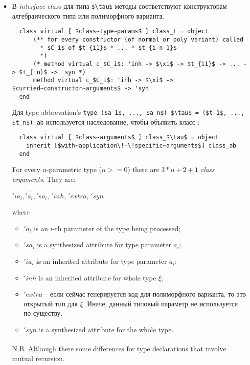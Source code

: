\documentclass[acmsmall,review,anonymous]{acmart}\settopmatter{printfolios=true,printccs=false,printacmref=false}
\begin{document}
\begin{itemize}
  \item В \textit{interface class} для типа \lstinline{$\tau$} методы соответствуют конструкторам алгебраического типа или полиморфного варианта. 
  \begin{lstlisting}
  class virtual [ $class~type~params$ ] class_t = object
      (** for every constructor (of normal or poly variant) called
        * $C_i$ of $t_{i1}$ * ... * $t_{i n_1}$
        *)
      (* method virtual c_$C_i$: 'inh -> $\xi$ -> $t_{i1}$ -> ... -> $t_{in}$ -> 'syn *)
      method virtual c_$C_i$: 'inh -> $\xi$ -> $curried~constructor~arguments$ -> 'syn
  end
  \end{lstlisting}
  Для type abbrevation's \lstinline{type ($a_1$, ..., $a_n$) $\tau$ = ($t_1$, ..., $t_n$) ab} 
  используется наследование, чтобы объявить класс : 
  \begin{lstlisting}
  class virtual [ $class~arguments$ ] class_$\tau$ = object
    inherit [$with~application\!-\!specific~arguments$] class_ab
  end
  \end{lstlisting}

  For every $n$-parametric type ($n>=0$) there are $3*n+2+1$ \emph{class arguments}. They are:
    \begin{center}
        $\overline{'ia_i, 'a_i, 'sa_i}$, $'inh$, $'extra$, $'syn$
    \end{center}
  where \begin{itemize}
          \item $'a_i$ is an $i$-th parameter of the type being processed;
          \item $'sa_i$ is a synthesized attribute for type parameter $a_i$;
          \item $'ia_i$ is an inherited attribute for type parameter $a_i$;
          \item $'inh$ is an inherited attribute for whole type $\xi$;
          \item $'extra$ -- если сейчас генерируется код для полиморфного варианта, то это открытый тип для $\xi$. Иначе, данный типовый параметр не используется по существу.
          \item $'syn$ is a synthesized attribute for the whole type.
  \end{itemize}
  
  \paragraph{}
  N.B. Although there some differences for type declarations that involve mutual recursion.
  

\end{itemize}
\end{document}
